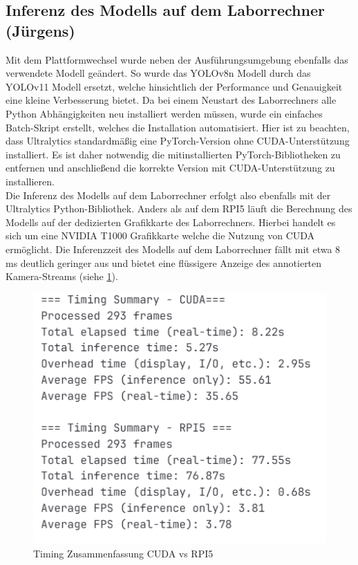 \subsection{Inferenz des Modells auf dem Laborrechner (Jürgens)}
Mit dem Plattformwechsel wurde neben der Ausführungsumgebung ebenfalls das verwendete Modell geändert. So wurde das YOLOv8n Modell durch das YOLOv11 Modell ersetzt, welche hinsichtlich der Performance und Genauigkeit eine kleine Verbesserung bietet. Da bei einem Neustart des Laborrechners alle Python Abhängigkeiten neu installiert werden müssen, wurde ein einfaches Batch-Skript erstellt, welches die Installation automatisiert. Hier ist zu beachten, dass Ultralytics standardmäßig eine PyTorch-Version ohne CUDA-Unterstützung installiert. Es ist daher notwendig die mitinstallierten PyTorch-Bibliotheken zu entfernen und anschließend die korrekte Version mit CUDA-Unterstützung zu installieren.
\\
Die Inferenz des Modells auf dem Laborrechner erfolgt also ebenfalls mit der Ultralytics Python-Bibliothek. Anders als auf dem RPI5 läuft die Berechnung des Modells auf der dedizierten Grafikkarte des Laborrechners. Hierbei handelt es sich um eine NVIDIA T1000 Grafikkarte welche die Nutzung von CUDA ermöglicht. Die Inferenzzeit des Modells auf dem Laborrechner fällt mit etwa 8 ms deutlich geringer aus und bietet eine flüssigere Anzeige des annotierten Kamera-Streams (siehe \ref{fig:Timing Zusammenfassung CUDA vs RPI5}). 
\begin{figure}[h]
\centering
\includegraphics[scale=0.5]{images/Timing_summary.png}
\caption{Timing Zusammenfassung CUDA vs RPI5}
\label{fig:Timing Zusammenfassung CUDA vs RPI5}
\end{figure}
\newpage

